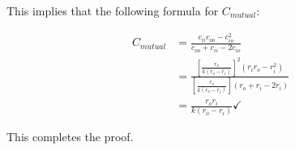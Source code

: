 \documentclass[paper=a4, fontsize=11pt]{scrartcl} %
\numberwithin{equation}{section} %
\numberwithin{figure}{section} %
\numberwithin{table}{section} %
\begin{document}
This implies that the following formula for $C_{mutual}$:

\begin{align}
C_{mutual} &= \frac{c_{ii}c_{oo} - c_{io}^2}{c_{oo} + c_{ii} - 2c_{io}} \\
&= \frac{\left[\frac{r_o}{k(r_o - r_i)}\right]^2(r_i r_o - r_i^2)}{\left[\frac{r_o}{k(r_o - r_i)}\right](r_o + r_i - 2 r_i)} \\
&= \frac{r_o r_i}{k(r_o - r_i)} \checkmark
\end{align}

This completes the proof.
\end{document}
